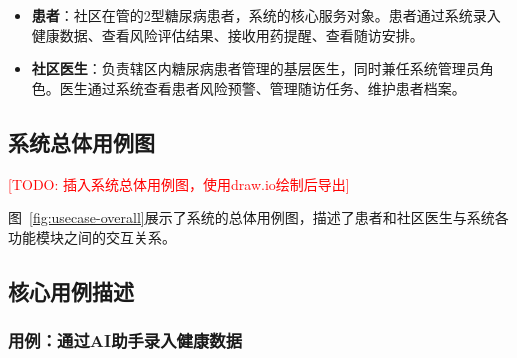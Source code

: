 \begin{itemize}
  \item \textbf{患者}：社区在管的2型糖尿病患者，系统的核心服务对象。患者通过系统录入健康数据、查看风险评估结果、接收用药提醒、查看随访安排。
  \item \textbf{社区医生}：负责辖区内糖尿病患者管理的基层医生，同时兼任系统管理员角色。医生通过系统查看患者风险预警、管理随访任务、维护患者档案。
\end{itemize}

\subsection{系统总体用例图}

\todofig{}

\textcolor{red}{[TODO: 插入系统总体用例图，使用draw.io绘制后导出]}

图~\ref{fig:usecase-overall}展示了系统的总体用例图，描述了患者和社区医生与系统各功能模块之间的交互关系。

\subsection{核心用例描述}

\subsubsection{用例：通过AI助手录入健康数据}


